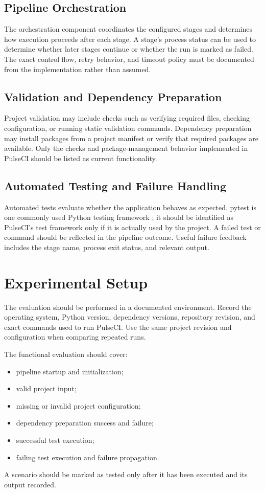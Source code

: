 \documentclass[conference]{IEEEtran}
\begin{document}
\subsection{Pipeline Orchestration}
The orchestration component coordinates the configured stages and determines how execution proceeds after each stage. A stage's process status can be used to determine whether later stages continue or whether the run is marked as failed. The exact control flow, retry behavior, and timeout policy must be documented from the implementation rather than assumed.

\subsection{Validation and Dependency Preparation}
Project validation may include checks such as verifying required files, checking configuration, or running static validation commands. Dependency preparation may install packages from a project manifest or verify that required packages are available. Only the checks and package-management behavior implemented in PulseCI should be listed as current functionality.

\subsection{Automated Testing and Failure Handling}
Automated tests evaluate whether the application behaves as expected. pytest is one commonly used Python testing framework \cite{pytest}; it should be identified as PulseCI's test framework only if it is actually used by the project. A failed test or command should be reflected in the pipeline outcome. Useful failure feedback includes the stage name, process exit status, and relevant output.

\section{Experimental Setup}
The evaluation should be performed in a documented environment. Record the operating system, Python version, dependency versions, repository revision, and exact commands used to run PulseCI. Use the same project revision and configuration when comparing repeated runs.

The functional evaluation should cover:
\begin{itemize}
    \item pipeline startup and initialization;
    \item valid project input;
    \item missing or invalid project configuration;
    \item dependency preparation success and failure;
    \item successful test execution;
    \item failing test execution and failure propagation.
\end{itemize}
A scenario should be marked as tested only after it has been executed and its output recorded.
\end{document}
